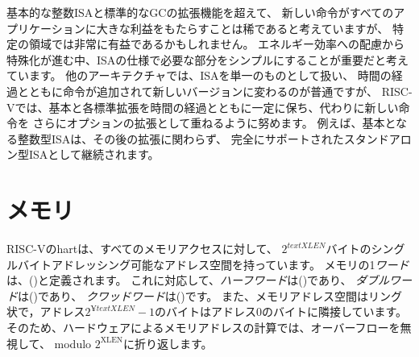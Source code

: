 基本的な整数ISAと標準的なGCの拡張機能を超えて、
新しい命令がすべてのアプリケーションに大きな利益をもたらすことは稀であると考えていますが、
特定の領域では非常に有益であるかもしれません。
エネルギー効率への配慮から特殊化が進む中、ISAの仕様で必要な部分をシンプルにすることが重要だと考えています。
他のアーキテクチャでは、ISAを単一のものとして扱い、
時間の経過とともに命令が追加されて新しいバージョンに変わるのが普通ですが、
RISC-Vでは、基本と各標準拡張を時間の経過とともに一定に保ち、代わりに新しい命令を
さらにオプションの拡張として重ねるように努めます。
例えば、基本となる整数型ISAは、その後の拡張に関わらず、
完全にサポートされたスタンドアロン型ISAとして継続されます。


\begin{comment}
\section{Memory}

A RISC-V hart has a single byte-addressable address space
of $2^{\text{XLEN}}$ bytes for all memory
accesses.  A {\em word} of memory is defined as \wunits{32}{bits}
(\wunits{4}{bytes}).  Correspondingly, a {\em halfword} is \wunits{16}{bits}
(\wunits{2}{bytes}), a {\em doubleword} is \wunits{64}{bits}
(\wunits{8}{bytes}), and a {\em quadword} is \wunits{128}{bits}
(\wunits{16}{bytes}).
The memory address space is circular, so that the byte at address
$2^{\text{XLEN}}-1$ is adjacent to the byte at address zero.  Accordingly, memory
address computations done by the hardware ignore overflow and instead
wrap around modulo $2^{\text{XLEN}}$.
\end{comment}

\section{メモリ}

RISC-Vのhartは、すべてのメモリアクセスに対して、
$2^{text{XLEN}}$バイトのシングルバイトアドレッシング可能なアドレス空間を持っています。 
メモリの1{\em ワード}は、()と定義されます。
これに対応して、{\em ハーフワード}は()であり、
{\em ダブルワード}は()であり、
{\em クワッドワード}は()です。
また、メモリアドレス空間はリング状で，アドレス$2^{¥text{XLEN}}-1$のバイトはアドレス0のバイトに隣接しています。
そのため、ハードウェアによるメモリアドレスの計算では、オーバーフローを無視して、
modulo $2^{\text{XLEN}}$に折り返します。

